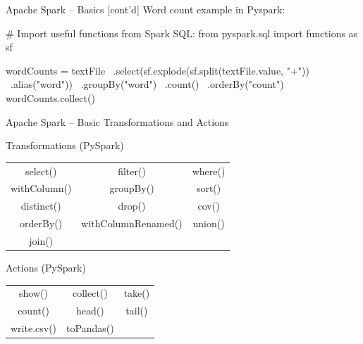 \documentclass[ignorenonframetext,xcolor=x11names]{beamer}
\begin{document}


\begin{frame}[label=withcode,fragile]{Apache Spark -- Basics \small [cont'd]}
Word count example in Pyspark:
\begin{pythoncode}
# Import useful functions from Spark SQL:
from pyspark.sql import functions as sf

wordCounts = textFile \
    .select(sf.explode(sf.split(textFile.value, "\s+")) \
        .alias("word")) \
    .groupBy("word") \
    .count() \
    .orderBy("count")
wordCounts.collect()
\end{pythoncode}
\end{frame}

\begin{frame}[label=advanced]{Apache Spark -- Basic Transformations and Actions}
\begin{block}{Transformations (PySpark)}
\centering
\renewcommand{\arraystretch}{1.5}
\begin{tabular}{ccc} 
select() & filter() & where() \\
withColumn() & groupBy() & sort() \\
distinct() & drop() & cov() \\
orderBy() & withColumnRenamed() & union() \\
join()  \\
\end{tabular}
\end{block}

\begin{block}{Actions (PySpark)}
\centering
\renewcommand{\arraystretch}{1.5}
\begin{tabular}{ccc} 
show() & collect() & take() \\
count() & head() & tail() \\
write.csv() & toPandas() & \\
\end{tabular}
\end{block}
\end{frame}
\end{document}
